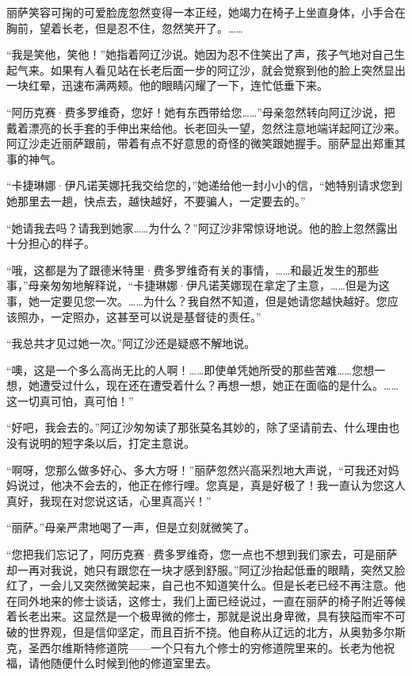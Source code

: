 \par 丽萨笑容可掬的可爱脸庞忽然变得一本正经，她竭力在椅子上坐直身体，小手合在胸前，望着长老，但是忍不住，忽然笑开了。……
\par “我是笑他，笑他！”她指着阿辽沙说。她因为忍不住笑出了声，孩子气地对自己生起气来。如果有人看见站在长老后面一步的阿辽沙，就会觉察到他的脸上突然显出一块红晕，迅速布满两颊。他的眼睛闪耀了一下，连忙低垂下来。
\par “阿历克赛·费多罗维奇，您好！她有东西带给您……”母亲忽然转向阿辽沙说，把戴着漂亮的长手套的手伸出来给他。长老回头一望，忽然注意地端详起阿辽沙来。阿辽沙走近丽萨跟前，带着有点不好意思的奇怪的微笑跟她握手。丽萨显出郑重其事的神气。
\par “卡捷琳娜·伊凡诺芙娜托我交给您的，”她递给他一封小小的信，“她特别请求您到她那里去一趟，快点去，越快越好，不要骗人，一定要去的。”
\par “她请我去吗？请我到她家……为什么？”阿辽沙非常惊讶地说。他的脸上忽然露出十分担心的样子。
\par “哦，这都是为了跟德米特里·费多罗维奇有关的事情，……和最近发生的那些事，”母亲匆匆地解释说，“卡捷琳娜·伊凡诺芙娜现在拿定了主意，……但是为这事，她一定要见您一次。……为什么？我自然不知道，但是她请您越快越好。您应该照办，一定照办，这甚至可以说是基督徒的责任。”
\par “我总共才见过她一次。”阿辽沙还是疑惑不解地说。
\par “噢，这是一个多么高尚无比的人啊！……即使单凭她所受的那些苦难……您想一想，她遭受过什么，现在还在遭受着什么？再想一想，她正在面临的是什么。……这一切真可怕，真可怕！”
\par “好吧，我会去的。”阿辽沙匆匆读了那张莫名其妙的，除了坚请前去、什么理由也没有说明的短字条以后，打定主意说。
\par “啊呀，您那么做多好心、多大方呀！”丽萨忽然兴高采烈地大声说，“可我还对妈妈说过，他决不会去的，他正在修行哩。您真是，真是好极了！我一直认为您这人真好，我现在对您说这话，心里真高兴！”
\par “丽萨。”母亲严肃地喝了一声，但是立刻就微笑了。
\par “您把我们忘记了，阿历克赛·费多罗维奇，您一点也不想到我们家去，可是丽萨却一再对我说，她只有跟您在一块才感到舒服。”阿辽沙抬起低垂的眼睛，突然又脸红了，一会儿又突然微笑起来，自己也不知道笑什么。但是长老已经不再注意。他在同外地来的修士谈话，这修士，我们上面已经说过，一直在丽萨的椅子附近等候着长老出来。这显然是一个极卑微的修士，那就是说出身卑微，具有狭隘而牢不可破的世界观，但是信仰坚定，而且百折不挠。他自称从辽远的北方，从奥勃多尔斯克，圣西尔维斯特修道院——一个只有九个修士的穷修道院里来的。长老为他祝福，请他随便什么时候到他的修道室里去。
